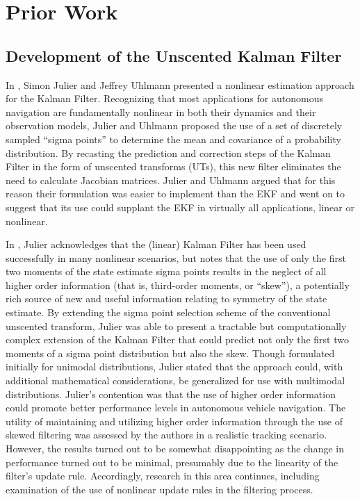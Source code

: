 \chapter{Prior Work}

\section{Development of the Unscented Kalman Filter}

In \cite{Julier1997}, Simon Julier and Jeffrey Uhlmann presented a nonlinear estimation approach for the Kalman Filter. Recognizing that most applications for autonomous navigation are fundamentally nonlinear in both their dynamics and their observation models, Julier and Uhlmann proposed the use of a set of discretely sampled ``sigma points'' to determine the mean and covariance of a probability distribution. By recasting the prediction and correction steps of the Kalman Filter in the form of unscented transforms (UTs), this new filter eliminates the need to calculate Jacobian matrices. Julier and Uhlmann argued that for this reason their formulation was easier to implement than the EKF and went on to suggest that its use could supplant the EKF in virtually all applications, linear or nonlinear.

In \cite{Julier1998}, Julier acknowledges that the (linear) Kalman Filter has been used successfully in many nonlinear scenarios, but notes that the use of only the first two moments of the state estimate sigma points results in the neglect of all higher order information (that is, third-order moments, or ``skew''), a potentially rich source of new and useful information relating to symmetry of the state estimate. By extending the sigma point selection scheme of the conventional unscented transform, Julier was able to present a tractable but computationally complex extension of the Kalman Filter that could predict not only the first two moments of a sigma point distribution but also the skew. Though formulated initially for unimodal distributions, Julier stated that the approach could, with additional mathematical considerations, be generalized for use with multimodal distributions. Julier's contention was that the use of higher order information could promote better performance levels in autonomous vehicle navigation. The utility of maintaining and utilizing higher order information through the use of skewed filtering was assessed by the authors in a realistic tracking scenario. However, the results turned out to be somewhat disappointing as the change in performance turned out to be minimal, presumably due to the linearity of the filter's update rule. Accordingly, research in this area continues, including examination of the use of nonlinear update rules in the filtering process.

